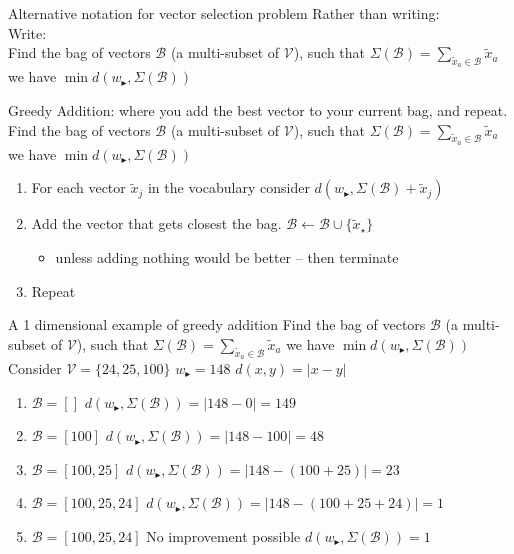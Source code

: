 \documentclass[]{beamer}
\newcommand{\x}{\tilde{x}}
\newcommand{\V}{\mathcal{V}}
\newcommand{\B}{\mathcal{B}}
\newcommand{\s}{w_{\blacktriangleright}}
\begin{document}
\newcommand{\vectorselectionproblemdefnalt}{Find the bag of vectors $\B$ (a multi-subset of $\V$), such that $\displaystyle \Sigma(\B)=\sum_{\x_a\in\B}\x_a$ we have  $\min d(\s,\Sigma(\B))$}

\begin{frame}{Alternative notation for vector selection problem}
	Rather than writing:\\
	\vectorselectionproblemdefn
	\vfill
	Write:\\
	\vectorselectionproblemdefnalt
	\vfill
\end{frame}


\begin{frame}{Greedy Addition: where you add the best vector to your current bag, and repeat.}
	\vectorselectionproblemdefnalt
	\vfill
	\begin{enumerate}
		\item For each vector $\x_j$ in the vocabulary consider  $d(\s, \Sigma(\B)+\x_j)$
		\item Add the vector that gets closest the bag. $\B\leftarrow\B\cup\{\x_\star\}$
		\begin{itemize}
			\item unless adding nothing would be better -- then terminate
		\end{itemize}
		\item Repeat
	\end{enumerate}
	\vfill
\end{frame}

\begin{frame}{A 1 dimensional example of greedy addition}
	\vectorselectionproblemdefnalt
	\vfill
	Consider $\V=\{24,25,100\}$ \hfill $\s=148$ \hfill $d(x,y)=|x-y|$
	\begin{enumerate}
		\item<1-> $\B=[]$ \hfill $d(\s,\Sigma(\B))=|148-0|=149$ 
		\item<2-> $\B=[100]$ \hfill $d(\s,\Sigma(\B))=|148-100|=48$ 
		\item<3-> $\B=[100,25]$ \hfill $d(\s,\Sigma(\B))=|148-(100+25)|=23$ 
		\item<4-> $\B=[100,25,24]$ \hfill $d(\s,\Sigma(\B))=|148-(100+25+24)|=1$ 
		\item<5-> $\B=[100,25,24]$ \hfill No improvement possible \hfill $d(\s,\Sigma(\B))=1$ 
	\end{enumerate}
	\vfill
	\vfill
\end{frame}
\end{document}
